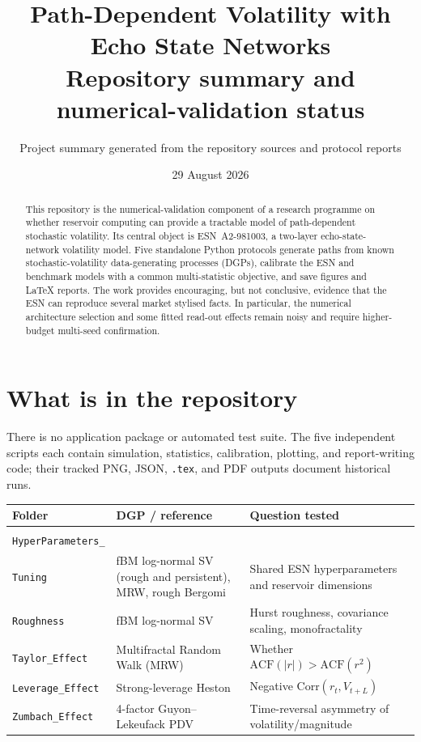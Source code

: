 \documentclass[10pt,a4paper]{article}
\title{\vspace{-1.2em}\textbf{Path-Dependent Volatility with Echo State Networks}\\[-.15em]
\large Repository summary and numerical-validation status}
\author{Project summary generated from the repository sources and protocol reports}
\date{29 August 2026}
\newcommand{\ESN}{\mbox{ESN A2-981003}}
\begin{document}
\maketitle
\vspace{-1.4em}

\begin{abstract}\small
This repository is the numerical-validation component of a research programme on whether reservoir computing can provide a tractable model of path-dependent stochastic volatility.  Its central object is \ESN, a two-layer echo-state-network volatility model.  Five standalone Python protocols generate paths from known stochastic-volatility data-generating processes (DGPs), calibrate the ESN and benchmark models with a common multi-statistic objective, and save figures and LaTeX reports.  The work provides encouraging, but not conclusive, evidence that the ESN can reproduce several market stylised facts.  In particular, the numerical architecture selection and some fitted read-out effects remain noisy and require higher-budget multi-seed confirmation.
\end{abstract}

\section{What is in the repository}
There is no application package or automated test suite.  The five independent scripts each contain simulation, statistics, calibration, plotting, and report-writing code; their tracked PNG, JSON, \texttt{.tex}, and PDF outputs document historical runs.

\begin{center}\small
\begin{tabular}{p{4.75cm}p{3.55cm}p{6.35cm}}
\toprule
Folder & DGP / reference & Question tested \\
\midrule
\shortstack[l]{\texttt{GridSearch\_}\\\texttt{HyperParameters\_}\\\texttt{Tuning}} & fBM log-normal SV (rough and persistent), MRW, rough Bergomi & Shared ESN hyperparameters and reservoir dimensions \\
\texttt{Roughness} & fBM log-normal SV & Hurst roughness, covariance scaling, monofractality \\
\texttt{Taylor\_Effect} & Multifractal Random Walk (MRW) & Whether $\mathrm{ACF}(|r|)>\mathrm{ACF}(r^2)$ \\
\texttt{Leverage\_Effect} & Strong-leverage Heston & Negative $\mathrm{Corr}(r_t,V_{t+L})$ \\
\texttt{Zumbach\_Effect} & 4-factor Guyon--Lekeufack PDV & Time-reversal asymmetry of volatility/magnitude \\
\bottomrule
\end{tabular}
\end{center}
\end{document}
